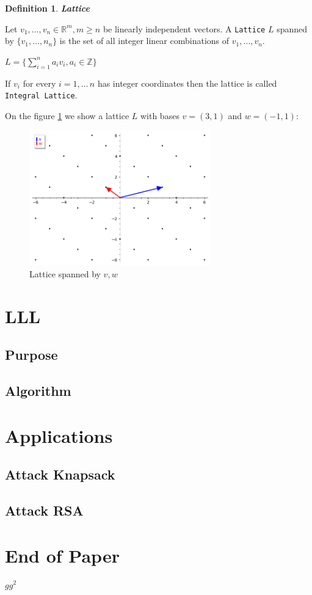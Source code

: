 \documentclass[a4paper,12pt]{report}
\newtheorem{definition}{Definition}[section]
\newcommand{\R}{\mathbb{R}}
\newcommand{\Z}{\mathbb{Z}}
\begin{document}
\begin{definition}
    \textbf{Lattice}
\end{definition}

Let $v_1,\ldots,v_n \in \R^m, m \ge n$ be linearly independent vectors. A \texttt{Lattice} $L$ spanned by $\{v_1,\ldots,n_n\}$ is the set of 
all integer linear combinations of $v_1,\ldots,v_n$.

\begin{center}
    $L = \bigg\{\sum_{i=1}^{n} a_iv_i, a_i \in \Z \bigg\}$
\end{center}

If $v_i$ for every $i = 1,\ldots\,n$ has integer coordinates then the lattice is
called \texttt{Integral Lattice}.

On the figure \ref{fig:lattice1} we show a lattice $L$ with bases $v=(3, 1)$ and $w=(-1, 1)$:

\begin{figure}[!b]
    \centering
    \includegraphics[width=0.7\textwidth]{./img/lattice.png}
    \caption{Lattice spanned by $v, w$}
    \label{fig:lattice1}
\end{figure}

\chapter{LLL}

\section{Purpose}

\section{Algorithm}

\chapter{Applications}

\section{Attack Knapsack}

\section{Attack RSA}

\chapter*{End of Paper}

$gg^2$



\end{document}
